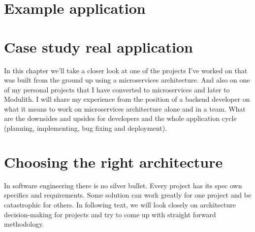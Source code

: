 




\chapter{Example application}
\label{chapter:example_application}


\chapter{Case study real application}
\label{chapter:personal_experience}
In this chapter we'll take a closer look at one of the projects I've worked on that was built from the ground up using a microservices architecture. And also on one of my personal projects that I have converted to microservices and later to Modulith. I will share my experience from the position of a backend developer on what it means to work on microservices architecture alone and in a team.  What are the downsides and upsides for developers and the whole application cycle (planning, implementing, bug fixing and deployment).



\chapter{Choosing the right architecture}
In software engineering there is no silver bullet. Every project has its spec own specifics and requirements. Some solution can work greatly for one project and be catastrophic for others. In following text, we will look closely on architecture decision-making for projects and try to come up with straight forward methodology.

